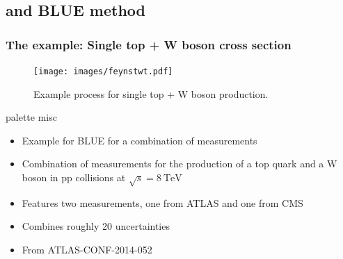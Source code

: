 \documentclass{beamer}
\begin{document}
\subsection{and BLUE method}
\begin{frame}
	\frametitle{The example: Single top + W boson cross section}\vspace{-2mm}
	\begin{figure}
		\texttt{[image: images/feynstwt.pdf]}
		\caption{Example process for single top + W boson production.}
	\end{figure}\vspace{-4mm}
	\begin{beamercolorbox}[rounded=true,shadow=true]{palette misc}
	\begin{itemize}
		\item  Example for BLUE for a combination of measurements
		\item  Combination of measurements for the production of a top quark and a W boson in pp collisions at $\sqrt{s} = \SI{8}{\TeV}$ 
		\item  Features two measurements, one from ATLAS and one from CMS
		\item  Combines roughly 20 uncertainties
		\item  From ATLAS-CONF-2014-052
	\end{itemize}\vspace{2mm}
\end{beamercolorbox}
\end{frame}
\end{document}
